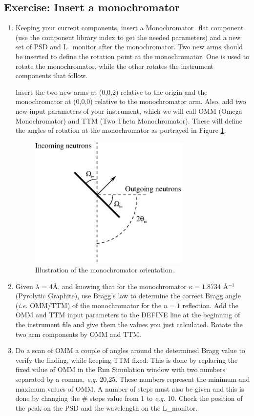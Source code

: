 \subsection{Exercise: Insert a monochromator}
\begin{enumerate}
\item{Keeping your current components, insert a Monochromator\_flat component (use the component library index to get the needed parameters) and a new set of PSD and L\_monitor after the monochromator. Two new arms should be inserted to define the rotation point at the monochromator. One is used to rotate the monochromator, while the other rotates the instrument components that follow. 

Insert the two new arms at (0,0,2) relative to the origin and the monochromator at (0,0,0) relative to the monochromator arm. Also, add two new input parameters of your instrument, which we will call OMM (Omega Monochromator) and TTM (Two Theta Monochromator). These will define the angles of rotation at the monochromator as portrayed in Figure \ref{mono.eps}. 
\begin{figure}[htb!]
\begin{center}
\includegraphics[width=8cm]{pics/mono.eps}
\end{center}
\caption{Illustration of the monochromator orientation.}
\label{mono.eps}
\end{figure}}
\item{Given $\lambda$ = 4\AA, and knowing that for the monochromator $\kappa=1.8734$ \AA$^{-1}$ (Pyrolytic Graphite), use Bragg's law to determine the correct Bragg angle (\emph{i.e.} OMM/TTM) of the monochromator for the $n=1$ reflection. Add the OMM and TTM input parameters to the DEFINE line at the beginning of the instrument file and give them the values you just calculated. Rotate the two arm components by OMM and TTM.}
\item{Do a scan of OMM a couple of angles around the determined Bragg value to verify the finding, while keeping TTM fixed. This is done by replacing the fixed value of OMM in the Run Simulation window with two numbers separated by a comma, \emph{e.g.} 20,25. These numbers represent the minimum and maximum values of OMM. A number of steps must also be given and this is done by changing the \# steps value from 1 to \emph{e.g.} 10. Check the position of the peak on the PSD and the wavelength on the L\_monitor. }

\end{enumerate}
